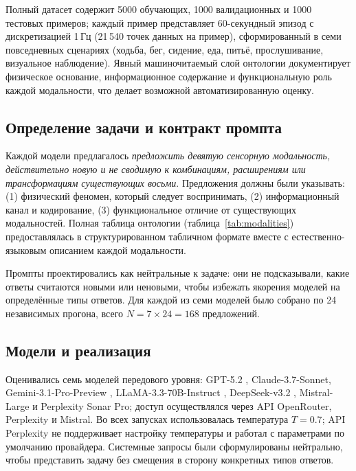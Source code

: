 \documentclass[sn-mathphys-num]{sn-jnl}
\begin{document}
Полный датасет содержит 5000 обучающих, 1000 валидационных и 1000 тестовых примеров; каждый пример представляет 60-секундный эпизод с дискретизацией 1\,Гц (21\,540 точек данных на пример), сформированный в семи повседневных сценариях (ходьба, бег, сидение, еда, питьё, прослушивание, визуальное наблюдение). Явный машиночитаемый слой онтологии документирует физическое основание, информационное содержание и функциональную роль каждой модальности, что делает возможной автоматизированную оценку.

\subsection{Определение задачи и контракт промпта}

Каждой модели предлагалось \emph{предложить девятую сенсорную модальность, действительно новую и не сводимую к комбинациям, расширениям или трансформациям существующих восьми}. Предложения должны были указывать: (1) физический феномен, который следует воспринимать, (2) информационный канал и кодирование, (3) функциональное отличие от существующих модальностей. Полная таблица онтологии (таблица~\ref{tab:modalities}) предоставлялась в структурированном табличном формате вместе с естественно-языковым описанием каждой модальности.

Промпты проектировались как нейтральные к задаче: они не подсказывали, какие ответы считаются новыми или неновыми, чтобы избежать якорения моделей на определённые типы ответов. Для каждой из семи моделей было собрано по 24 независимых прогона, всего $N = 7 \times 24 = 168$ предложений.

\subsection{Модели и реализация}

Оценивались семь моделей передового уровня: GPT-5.2 \cite{openai2023gpt4}, Claude-3.7-Sonnet, Gemini-3.1-Pro-Preview \cite{gemini15_2024}, LLaMA-3.3-70B-Instruct \cite{llama3herd_2024}, DeepSeek-v3.2 \cite{deepseekv3_2024,deepseekr1_2025}, Mistral-Large \cite{mixtral2024} и Perplexity Sonar Pro; доступ осуществлялся через API OpenRouter, Perplexity и Mistral. Во всех запусках использовалась температура $T=0.7$; API Perplexity не поддерживает настройку температуры и работал с параметрами по умолчанию провайдера. Системные запросы были сформулированы нейтрально, чтобы представить задачу без смещения в сторону конкретных типов ответов.
\end{document}
